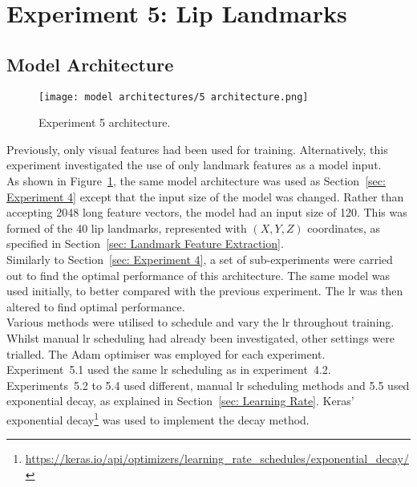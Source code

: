 \section{Experiment 5: Lip Landmarks}
\label{sec: Experiment 5}
\subsection{Model Architecture}
\begin{figure}
\centering
\texttt{[image: model architectures/5 architecture.png]}
\caption{Experiment 5 architecture.}
\label{fig:5 architecture}
\end{figure}
Previously, only visual features had been used for training. Alternatively, this experiment investigated the use of only landmark features as a model input.\\
As shown in Figure~\ref{fig:5 architecture}, the same model architecture was used as Section~\ref{sec: Experiment 4} except that the input size of the model was changed. Rather than accepting 2048 long feature vectors, the model had an input size of 120. This was formed of the 40 lip landmarks, represented with $(X, Y, Z)$ coordinates, as specified in Section~\ref{sec: Landmark Feature Extraction}.\\
Similarly to Section~\ref{sec: Experiment 4}, a set of sub-experiments were carried out to find the optimal performance of this architecture. The same model was used initially, to better compared with the previous experiment. The \acrshort{lr} was then altered to find optimal performance.\\
Various methods were utilised to schedule and vary the \acrshort{lr} throughout training. Whilst manual \acrshort{lr} scheduling had already been investigated, other settings were trialled. The Adam optimiser was employed for each experiment.\\
Experiment~5.1 used the same \acrshort{lr} scheduling as in experiment~4.2. Experiments~5.2 to 5.4 used different, manual \acrshort{lr} scheduling methods and 5.5 used exponential decay, as explained in Section~\ref{sec: Learning Rate}. Keras' exponential decay\footnote{\url{https://keras.io/api/optimizers/learning_rate_schedules/exponential_decay/}} was used to implement the decay method.
